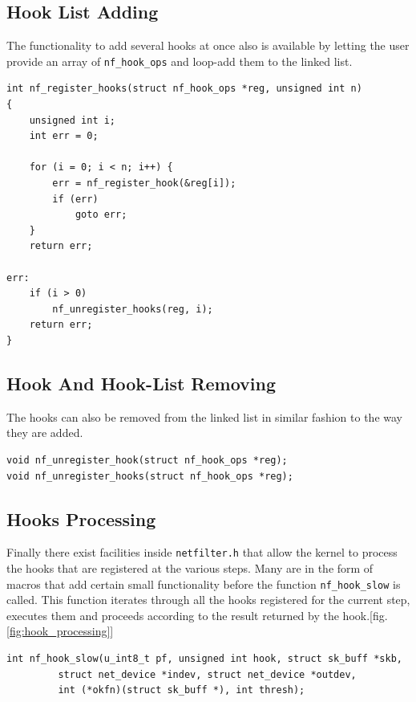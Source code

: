 \documentclass[a4paper,10pt]{article}
\newcommand{\figref}[1]{[fig. \ref{#1}]}
\begin{document}
\subsection{Hook List Adding}\label{hook_list_adding}
The functionality to add several hooks at once also is available by letting the user provide an array of \verb|nf_hook_ops| and loop-add them to the linked list.

\begin{lstlisting}
int nf_register_hooks(struct nf_hook_ops *reg, unsigned int n)
{
	unsigned int i;
	int err = 0;

	for (i = 0; i < n; i++) {
		err = nf_register_hook(&reg[i]);
		if (err)
			goto err;
	}
	return err;

err:
	if (i > 0)
		nf_unregister_hooks(reg, i);
	return err;
}
\end{lstlisting}

\subsection{Hook And Hook-List Removing}\label{hook_removing}
The hooks can also be removed from the linked list in similar fashion to the way they are added.

\begin{lstlisting}
void nf_unregister_hook(struct nf_hook_ops *reg);
void nf_unregister_hooks(struct nf_hook_ops *reg);
\end{lstlisting}

\subsection{Hooks Processing}\label{hooks_processing}
Finally there exist facilities inside \verb|netfilter.h| that allow the kernel to process the hooks that are registered at the various steps. Many are in the form of macros that add certain small functionality before the function \verb|nf_hook_slow| is called. This function iterates through all the hooks registered for the current step, executes them and proceeds according to the result returned by the hook.\figref{fig:hook_processing}

\begin{lstlisting}
int nf_hook_slow(u_int8_t pf, unsigned int hook, struct sk_buff *skb,
		 struct net_device *indev, struct net_device *outdev,
		 int (*okfn)(struct sk_buff *), int thresh);
\end{lstlisting}
\end{document}
